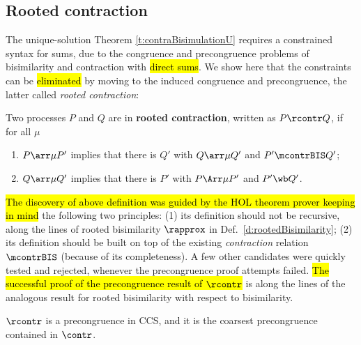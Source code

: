 \subsection{Rooted contraction}
\label{ss:new}

The unique-solution Theorem \ref{t:contraBisimulationU} requires a
constrained syntax for sums, due to the congruence and precongruence
problems of bisimilarity and contraction with \hl{direct sums}.
We show here that the constraints can be
\hl{eliminated} by moving to the induced congruence and precongruence, the
latter called \emph{rooted contraction}:
\begin{definition}
\label{d:rcontra}
Two processes $P$ and $Q$ are in \textbf{rooted contraction}, written as
 $P\rcontr Q$, if for all $\mu$
\begin{enumerate}
\item $P \arr\mu P'$ implies that there is $Q'$ with $Q \arr \mu Q'$
 and $P'\mcontrBIS Q'$;
\item $Q \arr\mu Q'$   implies that there is $P'$ with $P \Arr \mu
 P'$ and $P' \wb Q'$\enspace.
\end{enumerate}
\end{definition}


\hl{The discovery of above definition was guided by the HOL theorem
  prover keeping in mind}
the following two principles: (1) its definition should not be recursive,
along the lines of rooted bisimilarity
$\rapprox$ in Def.~\ref{d:rootedBisimilarity};
(2) its definition should be built on top of the existing \emph{contraction}
relation $\mcontrBIS$ (because of its completeness).
A few other candidates were quickly tested and rejected,
whenever the precongruence proof attempts failed. \hl{The successful
proof of the precongruence result of $\rcontr$} is along the lines of the analogous result
for rooted bisimilarity with respect to bisimilarity.

\begin{theorem}
\label{t:rcontrPrecongruence}
$\rcontr$ is a precongruence in CCS, and it is the
coarsest precongruence contained in $\contr$.
\end{theorem}

